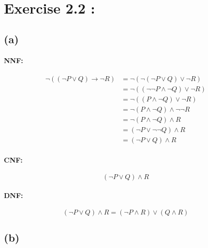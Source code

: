 \documentclass[a4paper,11pt]{report}
\begin{document}
\section*{Exercise 2.2 :}

\subsection*{(a)}

\paragraph*{NNF:}

\begin{align*}
  \neg ((\neg P \vee Q) \to \neg R) &= \neg(\neg (\neg P \vee Q) \vee \neg R)\\
                                    &= \neg((\neg\neg P \wedge \neg Q) \vee \neg R)\\
                                    &= \neg((P \wedge \neg Q) \vee \neg R)\\
                                    &= \neg (P \wedge \neg Q) \wedge \neg \neg R \\
                                    &= \neg (P \wedge \neg Q) \wedge R \\
                                    &= (\neg P \vee \neg \neg Q) \wedge R \\
                                    &= (\neg P \vee Q) \wedge R
\end{align*}

\paragraph*{CNF:}
$$
(\neg P \vee Q) \wedge R
$$

\paragraph*{DNF:}
$$
(\neg P \vee Q) \wedge R = (\neg P \wedge R) \vee (Q \wedge R)
$$

\subsection*{(b)}
\end{document}
